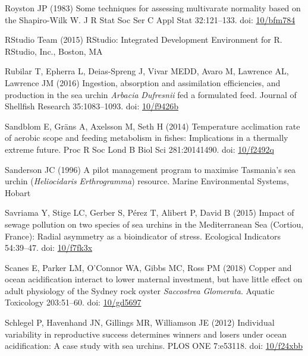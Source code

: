 \documentclass[a4paper,10pt, oneside]{memoir}
\begin{document}
\leavevmode\hypertarget{ref-Royston1983}{}%
Royston JP (1983) Some techniques for assessing multivarate normality based on the Shapiro-Wilk W. J R Stat Soc Ser C Appl Stat 32:121--133. doi: \href{https://doi.org/10/bfm784}{10/bfm784}

\leavevmode\hypertarget{ref-RStudioTeam2015}{}%
RStudio Team (2015) RStudio: Integrated Development Environment for R. RStudio, Inc., Boston, MA

\leavevmode\hypertarget{ref-Rubilar2016}{}%
Rubilar T, Epherra L, Deias-Spreng J, Vivar MEDD, Avaro M, Lawrence AL, Lawrence JM (2016) Ingestion, absorption and assimilation efficiencies, and production in the sea urchin \emph{Arbacia} \emph{Dufresnii} fed a formulated feed. Journal of Shellfish Research 35:1083--1093. doi: \href{https://doi.org/10/f9426b}{10/f9426b}

\leavevmode\hypertarget{ref-Sandblom2014}{}%
Sandblom E, Gräns A, Axelsson M, Seth H (2014) Temperature acclimation rate of aerobic scope and feeding metabolism in fishes: Implications in a thermally extreme future. Proc R Soc Lond B Biol Sci 281:20141490. doi: \href{https://doi.org/10/f2492q}{10/f2492q}

\leavevmode\hypertarget{ref-Sanderson1996}{}%
Sanderson JC (1996) A pilot management program to maximise Tasmania's sea urchin (\emph{Heliocidaris} \emph{Erthrogramma}) resource. Marine Environmental Systems, Hobart

\leavevmode\hypertarget{ref-Savriama2015}{}%
Savriama Y, Stige LC, Gerber S, Pérez T, Alibert P, David B (2015) Impact of sewage pollution on two species of sea urchins in the Mediterranean Sea (Cortiou, France): Radial asymmetry as a bioindicator of stress. Ecological Indicators 54:39--47. doi: \href{https://doi.org/10/f7fk3x}{10/f7fk3x}

\leavevmode\hypertarget{ref-Scanes2018}{}%
Scanes E, Parker LM, O'Connor WA, Gibbs MC, Ross PM (2018) Copper and ocean acidification interact to lower maternal investment, but have little effect on adult physiology of the Sydney rock oyster \emph{Saccostrea} \emph{Glomerata}. Aquatic Toxicology 203:51--60. doi: \href{https://doi.org/10/gd5697}{10/gd5697}

\leavevmode\hypertarget{ref-Schlegel2012}{}%
Schlegel P, Havenhand JN, Gillings MR, Williamson JE (2012) Individual variability in reproductive success determines winners and losers under ocean acidification: A case study with sea urchins. PLOS ONE 7:e53118. doi: \href{https://doi.org/10/f24xbb}{10/f24xbb}
\end{document}
